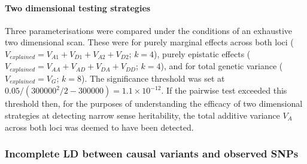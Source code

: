 \paragraph{Two dimensional testing strategies}
Three parameterisations were compared under the conditions of an exhaustive two dimensional scan. These were for purely marginal effects across both loci ($V_{explained} = V_{A1}+V_{D1}+V_{A2}+V_{D2}$; $k = 4$), purely epistatic effects ($V_{explained} = V_{AA}+V_{AD}+V_{DA}+V_{DD}$; $k = 4$), and for total genetic variance ($V_{explained} = V_G$; $k=8$). The significance threshold was set at $0.05/(300000^2/2-300000) = 1.1\times10^{-12}$. If the pairwise test exceeded this threshold then, for the purposes of understanding the efficacy of two dimensional strategies at detecting narrow sense heritability, the total additive variance $V_A$ across both loci was deemed to have been detected.

\subsubsection{Incomplete LD between causal variants and observed SNPs}

